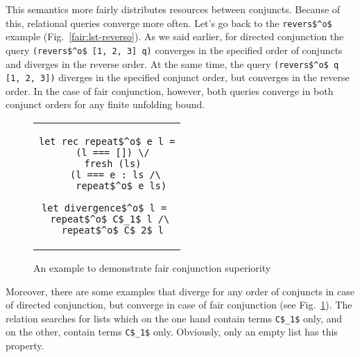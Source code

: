 This semantics more fairly distributes resources between conjuncts. Because of this, relational queries converge more often. Let's go back to the \lstinline{revers$^o$} example
(Fig.~\ref{fair:lst-reverso}). As we said earlier, for directed conjunction the query \lstinline{(revers$^o$ [1, 2, 3] q)} converges in the specified order of conjuncts and diverges
in the reverse order. At the same time, the query \lstinline{(revers$^o$ q [1, 2, 3])} diverges in the specified conjunct order, but converges in the reverse order. In the case of fair conjunction,
however, both queries converge in both conjunct orders for any finite unfolding bound. 

\begin{figure}[h!]
\centering
\begin{tabular}{c}
\begin{lstlisting}
let rec repeat$^o$ e l =
  (l === []) \/
  fresh (ls)
    (l === e : ls /\ 
     repeat$^o$ e ls)
     
let divergence$^o$ l = 
  repeat$^o$ C$_1$ l /\ 
  repeat$^o$ C$_2$ l
\end{lstlisting}
\end{tabular}

\caption{An example to demonstrate fair conjunction superiority}
\label{fair:lst-repeato}
\end{figure}

Moreover, there are some examples that diverge for any order of conjuncts in case of directed conjunction, but converge in case of fair conjunction (see Fig.~\ref{fair:lst-repeato}).
The relation searches for lists which on the one hand contain terms \lstinline{C$_1$} only, and on the other, contain terms \lstinline{C$_1$} only. Obviously, only an empty list has this property.

